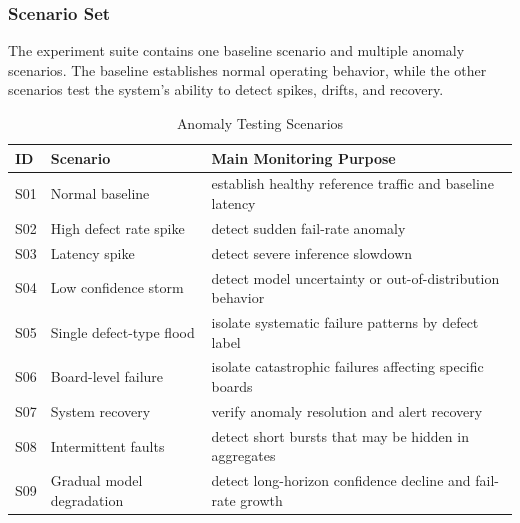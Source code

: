\documentclass[12pt,a4paper]{article}
\begin{document}
\subsubsection{Scenario Set}
The experiment suite contains one baseline scenario and multiple anomaly
scenarios. The baseline establishes normal operating behavior, while the other
scenarios test the system's ability to detect spikes, drifts, and recovery.

\begin{table}[!ht]
\centering
\caption{Anomaly Testing Scenarios}
\label{tab:scenario_suite}
\begin{tabular}{p{} p{} p{}}
\toprule
\textbf{ID} & \textbf{Scenario} & \textbf{Main Monitoring Purpose} \\
\midrule
S01 & Normal baseline & establish healthy reference traffic and baseline latency \\
S02 & High defect rate spike & detect sudden fail-rate anomaly \\
S03 & Latency spike & detect severe inference slowdown \\
S04 & Low confidence storm & detect model uncertainty or out-of-distribution behavior \\
S05 & Single defect-type flood & isolate systematic failure patterns by defect label \\
S06 & Board-level failure & isolate catastrophic failures affecting specific boards \\
S07 & System recovery & verify anomaly resolution and alert recovery \\
S08 & Intermittent faults & detect short bursts that may be hidden in aggregates \\
S09 & Gradual model degradation & detect long-horizon confidence decline and fail-rate growth \\
\bottomrule
\end{tabular}
\end{table}
\end{document}
